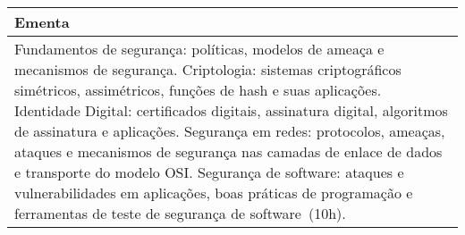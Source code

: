 \begin{quadro}[ht!]
\begin{tabular}{|p{3cm} p{2cm} p{3cm} p{2cm} p{3cm} p{2cm}|}
\multicolumn{6}{|p{15cm}|}{\cellcolor{blue1} Ementa} \\\hline
\hline\multicolumn{6}{|p{15cm}|}{\scriptsize Fundamentos de segurança: políticas, modelos de ameaça e mecanismos de segurança. Criptologia: sistemas criptográficos simétricos, assimétricos, funções de hash e suas aplicações. Identidade Digital: certificados digitais, assinatura digital, algoritmos de assinatura e aplicações. Segurança em redes: protocolos, ameaças, ataques e mecanismos de segurança nas camadas de enlace de dados e transporte do modelo OSI. Segurança de software: ataques e vulnerabilidades em aplicações, boas práticas de programação e ferramentas de teste de segurança de software (10h).}\\\hline
\hline
	\end{tabular}
\end{quadro}
\clearpage

